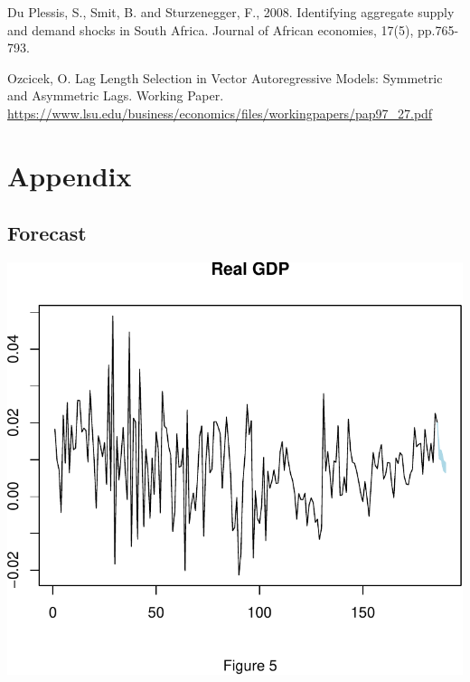 \documentclass[11pt,preprint, authoryear]{elsarticle}
\numberwithin{equation}{section}
\numberwithin{figure}{section}
\numberwithin{table}{section}
\begin{document}
Du Plessis, S., Smit, B. and Sturzenegger, F., 2008. Identifying
aggregate supply and demand shocks in South Africa. Journal of African
economies, 17(5), pp.765-793.

Ozcicek, O. Lag Length Selection in Vector Autoregressive Models:
Symmetric and Asymmetric Lags. Working Paper.
\url{https://www.lsu.edu/business/economics/files/workingpapers/pap97_27.pdf}

\newpage

\hypertarget{appendix}{%
\section{Appendix}\label{appendix}}

\hypertarget{forecast}{%
\subsection{Forecast}\label{forecast}}

\includegraphics{TS_proj_files/figure-latex/unnamed-chunk-26-1.pdf}
\end{document}
